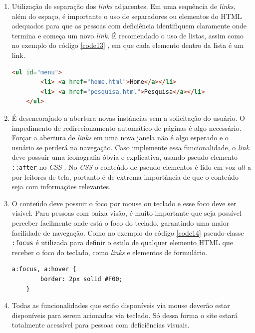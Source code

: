 {{\begin{enumerate}
    \item Utilização de separação dos \textit{links} adjacentes. Em uma sequência de \textit{links}, além do espaço, é importante o uso de separadores ou elementos do HTML \cite{HTML} adequados para que as pessoas com deficiência identifiquem claramente onde termina e começa um novo \textit{link}. É recomendado o uso de listas, assim como no exemplo do código \ref{code13} , em que cada elemento dentro da lista é um link.
    {\begin{lstlisting}[language=html,caption={Separação de \textit{links} adjacentes usando a \textit{tag} li.}, label=code13]
    <ul id="menu">
        <li> <a href="home.html">Home</a></li>
        <li> <a href="pesquisa.html">Pesquisa</a></li>
    </ul>
    \end{lstlisting}}
    
    \item É desencorajado a abertura novas instâncias sem a solicitação do usuário. O impedimento de  redirecionamento automático de páginas é algo necessário. Forçar a abertura de \textit{links} em uma nova janela não é algo esperado e o usuário se perderá na navegação. Caso implemente essa funcionalidade, o \textit{link} deve possuir uma iconografia óbvia e explicativa, usando pseudo-elemento \lstinline{::after} no \textit{CSS} \cite{css}. No \textit{CSS} \cite{CSS} o conteúdo de pseudo-elementos é lido em voz \textit{alt} a por leitores de tela, portanto é de extrema importância de que o conteúdo seja com informações relevantes.
    
    \item O conteúdo deve possuir o foco por mouse ou teclado e esse foco deve ser visível. Para pessoas com baixa visão, é muito importante que seja possível perceber facilmente onde está o foco do teclado, garantindo uma maior facilidade de navegação. Como no exemplo do código \ref{code14} pseudo-classe \lstinline{:focus} é utilizada para definir o estilo de qualquer elemento HTML \cite{HTML} que receber o foco do teclado, como \textit{links} e elementos de formulário.
    {\begin{lstlisting}[language=html,caption={Exemplo de como estilizar o o elemento nos estados de foco e hover.}, label=code14]
    a:focus, a:hover {
        border: 2px solid #F00;
    }
    \end{lstlisting}}
    
    \item Todas as funcionalidades que estão disponíveis via mouse deverão estar disponíveis para serem acionadas via teclado. Só dessa forma o site estará totalmente acessível para pessoas com deficiências visuais.
    
\end{enumerate}

}}

